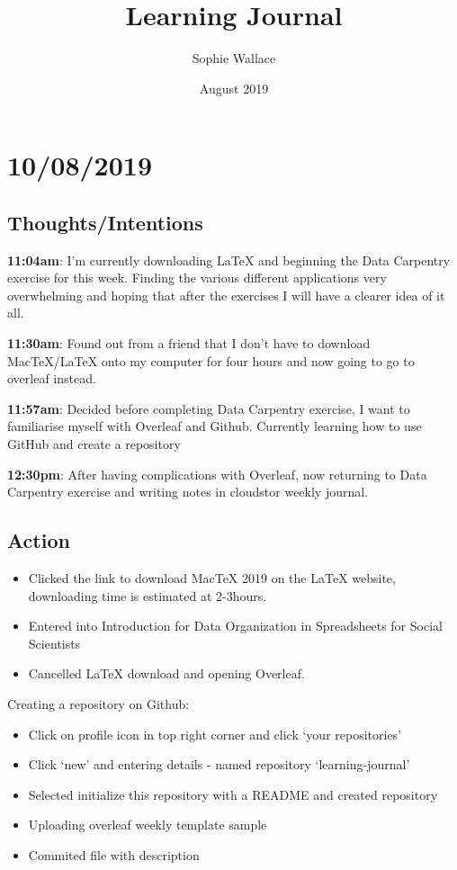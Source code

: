 \documentclass{article}
\title{Learning Journal}
\author{Sophie Wallace }
\date{August 2019}
\begin{document}
\maketitle
\tableofcontents


\section{10/08/2019}
\subsection{Thoughts/Intentions}

\textbf{11:04am}: I’m currently downloading LaTeX and beginning the Data Carpentry exercise for this week. Finding the various different applications very overwhelming and hoping that after the exercises I will have a clearer idea of it all. 


\textbf{11:30am}: Found out from a friend that I don’t have to download MacTeX/LaTeX onto my computer for four hours and now going to go to overleaf instead. 


\textbf{11:57am}: Decided before completing Data Carpentry exercise, I want to familiarise myself with Overleaf and Github. Currently learning how to use GitHub and create a repository 


\textbf{12:30pm}: After having complications with Overleaf, now returning to Data Carpentry exercise and writing notes in cloudstor weekly journal. 

\subsection{Action}

\begin{itemize}
\item Clicked the link to download MacTeX 2019 on the LaTeX website, downloading time is estimated at 2-3hours. 
\item Entered into Introduction for Data Organization in Spreadsheets for Social Scientists
\item Cancelled LaTeX download and opening Overleaf. 
\end{itemize}



Creating a repository on Github:

\begin{itemize}
\item Click on profile icon in top right corner and click ‘your repositories’
\item Click ‘new’ and entering details - named repository ‘learning-journal’
\item Selected initialize this repository with a README and created repository
\item Uploading overleaf weekly template sample
\item Commited file with description
\end{itemize}
 
\end{document}
